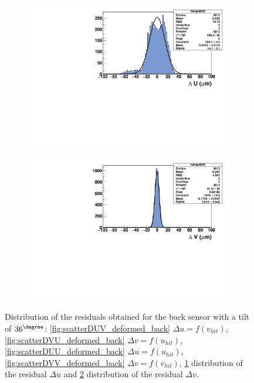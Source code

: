 \begin{figure}[!h]
        \begin{subfigure}[t]{0.45\textwidth}
          \centering
          \includegraphics[width = 1.2\textwidth]{Pictures/deformation/deltaU_6_deformed.pdf}
          \caption{}
          \label{fig:residualUDef_back}
        \end{subfigure}
        \hfill
        \begin{subfigure}[t]{0.45\textwidth}
          \centering
          \includegraphics[width = 1.2\textwidth]{Pictures/deformation/deltaV_6_deformed.pdf}
          \caption{}
          \label{fig:residualVDef_back}
        \end{subfigure}
        \caption{Distribution of the residuals obtained for the back sensor with a tilt of $36^{\degree}$: \ref{fig:scatterDUV_deformed_back} $\Delta u = f(v_{hit})$, 
        \ref{fig:scatterDVU_deformed_back} $\Delta v = f(u_{hit})$, \ref{fig:scatterDUU_deformed_back} $\Delta u = f(u_{hit})$,
        \ref{fig:scatterDVV_deformed_back} $\Delta v = f(v_{hit})$, \ref{fig:residualUDef_back} distribution of the residual $\Delta u$ and \ref{fig:residualVDef_back} distribution of the residual $\Delta v$.
        }
        \label{fig:alignmentPlane8Deformed_back}
      \end{figure}


